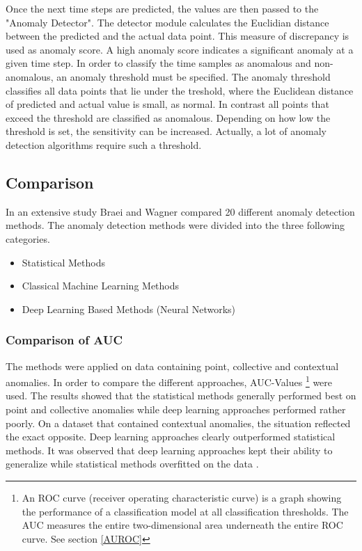 Once the next time steps are predicted, the values are then passed to the "Anomaly Detector". The detector module calculates the Euclidian distance between the predicted and the actual data point. This measure of discrepancy is used as anomaly score. A high anomaly score indicates a significant anomaly at a given time step. In order to classify the time samples as anomalous and non-anomalous, an anomaly threshold must be specified. The anomaly threshold classifies all data points that lie under the treshold, where the Euclidean distance of predicted and actual value is small, as normal. In contrast all points that exceed the threshold are classified as anomalous. Depending on how low the threshold is set, the sensitivity can be increased. Actually, a lot of anomaly detection algorithms require such a threshold.


\subsection{Comparison} \label{comparison}
In an extensive study Braei and Wagner \parencite*{Braei2020} compared 20 different anomaly detection methods. The anomaly detection methods were divided into the three following  categories. 

\begin{itemize}
	\item Statistical Methods
	\item Classical Machine Learning Methods
	\item Deep Learning Based Methods (Neural Networks)
\end{itemize}


\subsubsection{Comparison of AUC}
The methods were applied on data containing point, collective and contextual anomalies. In order to compare the different approaches, AUC-Values \footnote{An ROC curve (receiver operating characteristic curve) is a graph showing the performance of a classification model at all classification thresholds. The AUC measures the entire two-dimensional area underneath the entire ROC curve. See section \ref{AUROC}} were used. The results showed that the statistical methods generally performed best on point and collective anomalies while deep learning approaches performed rather poorly. On a dataset that contained contextual anomalies, the situation reflected the exact opposite. Deep learning approaches clearly outperformed statistical methods. It was observed that deep learning approaches kept their ability to generalize while statistical methods overfitted on the data \parencite{Braei2020}.

